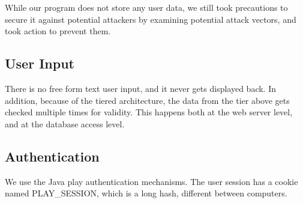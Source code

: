 
While our program does not store any user data,
we still took precautions to secure it against potential attackers by examining 
potential attack vectors, and took action to prevent them.

\subsection{User Input}
There is no free form text user input, and it never gets displayed back.
In addition, because of the tiered architecture, the data from the tier above gets checked multiple times for validity.
This happens both at the web server level, and at the database access level.

\subsection{Authentication}
We use the Java play authentication mechanisms.
The user session has a cookie named PLAY\_SESSION, which is a long hash, different between computers.

